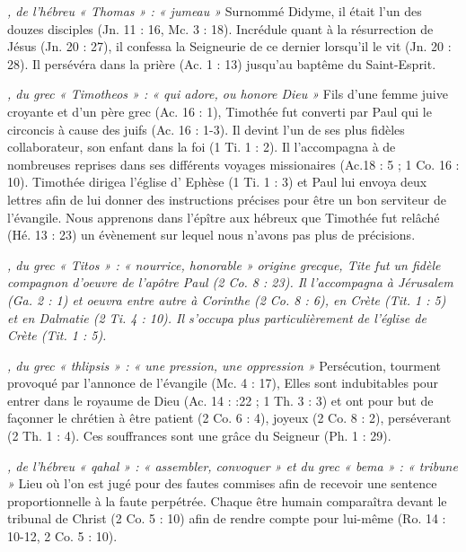 \begin{multicols}{2}
\textit{, de l'hébreu « Thomas » : « jumeau »}\newline
Surnommé Didyme, il était l'un des douzes disciples (Jn. 11 : 16, Mc. 3 : 18). Incrédule quant à la résurrection de Jésus (Jn. 20 : 27), il confessa la Seigneurie de ce dernier lorsqu'il le vit (Jn. 20 : 28). Il persévéra dans la prière (Ac. 1 : 13) jusqu'au baptême du Saint-Esprit.

\textit{, du grec « Timotheos » : « qui adore, ou honore Dieu »}\newline
Fils d'une femme juive croyante et d'un père grec (Ac. 16 : 1), Timothée fut converti par Paul qui le circoncis à cause des juifs (Ac. 16 : 1-3). Il devint l'un de ses plus fidèles collaborateur, son enfant dans la foi (1 Ti. 1 : 2). Il l'accompagna à de nombreuses reprises dans ses différents voyages missionaires (Ac.18 : 5 ; 1 Co. 16 : 10). Timothée dirigea l'église d' Ephèse (1 Ti. 1 : 3) et Paul lui envoya deux lettres afin de lui donner des instructions précises pour être un bon serviteur de l'évangile. Nous apprenons dans l'épître aux hébreux que Timothée fut relâché (Hé. 13 : 23) un évènement sur lequel nous n'avons pas plus de précisions.

\textit{, du grec « Titos » : « nourrice, honorable »}\newline
{}\textit{origine grecque, Tite fut un fidèle compagnon d'oeuvre de l'apôtre Paul (2 Co. 8 : 23). Il l'accompagna à Jérusalem (Ga. 2 : 1) et oeuvra entre autre à Corinthe (2 Co. 8 : 6), en Crète (Tit. 1 : 5) et en Dalmatie (2 Ti. 4 : 10). Il s'occupa plus particulièrement de l'église de Crète (Tit. 1 : 5).}\newline

\textit{, du grec « thlipsis » : « une pression, une oppression »}\newline
Persécution, tourment provoqué par l'annonce de l'évangile (Mc. 4 : 17), Elles sont indubitables pour entrer dans le royaume de Dieu (Ac. 14 : :22 ; 1 Th. 3 : 3) et ont pour but de façonner le chrétien à être patient (2 Co. 6 : 4), joyeux (2 Co. 8 : 2), perséverant (2 Th. 1 : 4). Ces souffrances sont une grâce du Seigneur (Ph. 1 : 29).

\textit{, de l'hébreu « qahal » : « assembler, convoquer » et du grec « bema » : « tribune »}\newline
Lieu où l'on est jugé pour des fautes commises afin de recevoir une sentence proportionnelle à la faute perpétrée. Chaque être humain comparaîtra devant le tribunal de Christ (2 Co. 5 : 10) afin de rendre compte pour lui-même (Ro. 14 : 10-12, 2 Co. 5 : 10).


\end{multicols}
